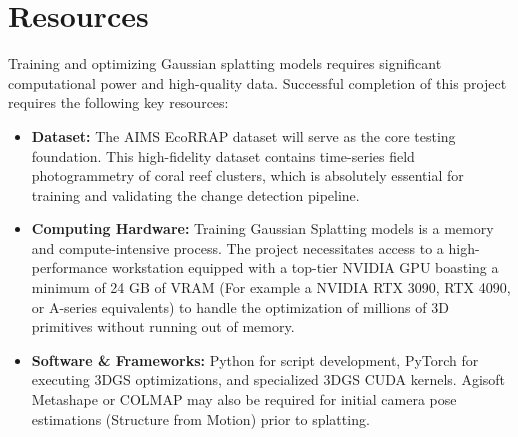 \section{Resources}
Training and optimizing Gaussian splatting models requires significant computational power and high-quality data. Successful completion of this project requires the following key resources:
\begin{itemize}
    \item \textbf{Dataset:} The AIMS EcoRRAP dataset will serve as the core testing foundation. This high-fidelity dataset contains time-series field photogrammetry of coral reef clusters, which is absolutely essential for training and validating the change detection pipeline.
    \item \textbf{Computing Hardware:} Training Gaussian Splatting models is a memory and compute-intensive process. The project necessitates access to a high-performance workstation equipped with a top-tier NVIDIA GPU boasting a minimum of 24 GB of VRAM (For example a NVIDIA RTX 3090, RTX 4090, or A-series equivalents) to handle the optimization of millions of 3D primitives without running out of memory.
    \item \textbf{Software \& Frameworks:} Python for script development, PyTorch for executing 3DGS optimizations, and specialized 3DGS CUDA kernels. Agisoft Metashape or COLMAP may also be required for initial camera pose estimations (Structure from Motion) prior to splatting.
\end{itemize}
